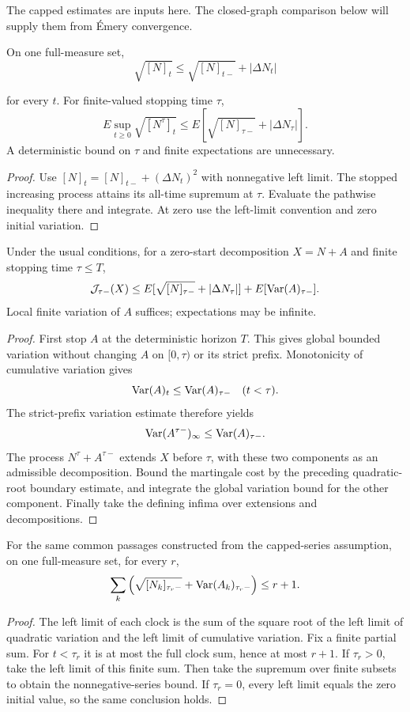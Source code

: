 The capped estimates are inputs here. The closed-graph comparison below will
supply them from Émery convergence.
\begin{lemma}
On one full-measure set,
\[
 \sqrt{[N]_t}\leq\sqrt{[N]_{t-}}+|\Delta N_t|
\]

for every $t$. For finite-valued stopping time $\tau$,
\[
 E\sup_{t\geq0}\sqrt{[N^\tau]_t}
 \leq E[\sqrt{[N]_{\tau-}}+|\Delta N_\tau|].
\]
A deterministic bound on $\tau$ and finite expectations are unnecessary.
\end{lemma}
\begin{proof}
Use $[N]_t=[N]_{t-}+(\Delta N_t)^2$ with nonnegative left limit.
The stopped increasing process attains its all-time supremum at $\tau$.
Evaluate the pathwise inequality there and integrate. At zero use the
left-limit convention and zero initial variation.
\end{proof}
\begin{lemma}
Under the usual conditions, for a zero-start decomposition $X=N+A$ and
finite stopping time $\tau\leq T$,
\[
 \mathcal J_{\tau-}(X)\leq
 E[\sqrt{[N]_{\tau-}}+|\Delta N_\tau|]+E[\operatorname{Var}(A)_{\tau-}].
\]
Local finite variation of $A$ suffices; expectations may be infinite.
\end{lemma}
\begin{proof}
First stop $A$ at the deterministic horizon $T$. This gives global bounded
variation without changing $A$ on $[0,\tau)$ or its strict prefix.
Monotonicity of cumulative variation gives
\[
 \operatorname{Var}(A)_t\leq\operatorname{Var}(A)_{\tau-}\quad(t<\tau).
\]
The strict-prefix variation estimate therefore yields
\[
 \operatorname{Var}(A^{\tau-})_\infty\leq\operatorname{Var}(A)_{\tau-}.
\]
The process $N^\tau+A^{\tau-}$ extends $X$ before $\tau$, with these two
components as an admissible decomposition. Bound the martingale cost by
the preceding quadratic-root boundary estimate, and integrate the global
variation bound for the other component. Finally take the defining infima
over extensions and decompositions.
\end{proof}
\begin{lemma}
For the same common passages constructed from the capped-series assumption,
on one full-measure set, for every $r$,
\[
 \sum_k\left(\sqrt{[N_k]_{\tau_r-}}+\operatorname{Var}(A_k)_{\tau_r-}\right)\leq r+1.
\]
\end{lemma}
\begin{proof}
The left limit of each clock is the sum of the square root of the left
limit of quadratic variation and the left limit of cumulative variation.
Fix a finite partial sum. For $t<\tau_r$ it is at most the full clock sum,
hence at most $r+1$. If $\tau_r>0$, take the left limit of this finite sum.
Then take the supremum over finite subsets to obtain the nonnegative-series
bound. If $\tau_r=0$, every left limit equals the zero initial value,
so the same conclusion holds.
\end{proof}
